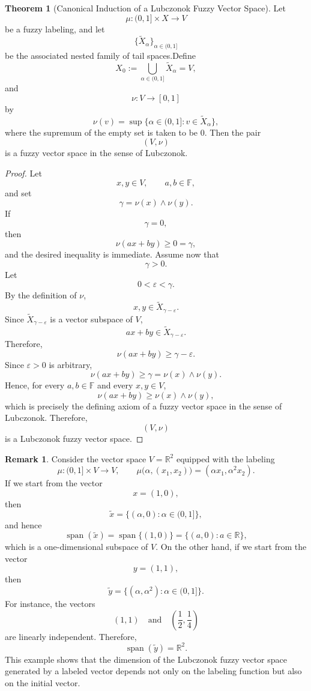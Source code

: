 \documentclass[preprint,12pt]{elsarticle}
\theoremstyle{definition}
\newtheorem{remark}{Remark}[section]
\newtheorem{theorem}{Theorem}[section]
\begin{document}
\begin{theorem}[Canonical Induction of a Lubczonok Fuzzy Vector Space]
	\label{thm:canonical-induction}
	Let
	\[
	\mu:(0,1]\times X\longrightarrow V
	\]
	be a fuzzy labeling, and let
	\[
	\{\widetilde X_\alpha\}_{\alpha\in(0,1]}
	\]
	be the associated nested family of tail spaces.Define
		\[
	X_0:=
	\bigcup_{\alpha\in(0,1]}
	\widetilde X_\alpha
	=
	V,
	\]
	and
	\[
	\nu:V\longrightarrow[0,1]
	\]
	by
	\[
	\nu(v)
	=
	\sup\{\alpha\in(0,1]:v\in\widetilde X_\alpha\},
	\]
	where the supremum of the empty set is taken to be \(0\).
	Then the pair
	\[
	(V,\nu)
	\]
	is a fuzzy vector space in the sense of Lubczonok.
\end{theorem}

\begin{proof}
	
Let
	\[
	x,y\in V,
	\qquad
	a,b\in\mathbb F,
	\]
	and set
	\[
	\gamma
	=
	\nu(x)\wedge\nu(y).
	\]
	If
	\[
	\gamma=0,
	\]
	then
	\[
	\nu(ax+by)\ge0=\gamma,
	\]
	and the desired inequality is immediate.
	Assume now that
	\[
	\gamma>0.
	\]
	Let
	\[
	0<\varepsilon<\gamma.
	\]
	By the definition of \(\nu\),
	\[
	x,y\in
	\widetilde X_{\gamma-\varepsilon}.
	\]
	Since
	\(
	\widetilde X_{\gamma-\varepsilon}
	\)
	is a vector subspace of \(V\),
	\[
	ax+by
	\in
	\widetilde X_{\gamma-\varepsilon}.
	\]
	Therefore,
	\[
	\nu(ax+by)
	\ge
	\gamma-\varepsilon.
	\]
	Since \(\varepsilon>0\) is arbitrary,
	\[
	\nu(ax+by)
	\ge
	\gamma
	=
	\nu(x)\wedge\nu(y).
	\]
	Hence, for every
	\(a,b\in\mathbb F\) and every
	\(x,y\in V\),
	\[
	\nu(ax+by)
	\ge
	\nu(x)\wedge\nu(y),
	\]
	which is precisely the defining axiom of a fuzzy vector space in the sense
	of Lubczonok.
	Therefore,
	\[
	(V,\nu)
	\]
	is a Lubczonok fuzzy vector space.
	
\end{proof}



	
	 
	\begin{remark}
		Consider the vector space $V=\mathbb{R}^{2}$ equipped with the labeling
		\[
		\mu:(0,1]\times V\longrightarrow V,
		\qquad
		\mu\bigl(\alpha,(x_{1},x_{2})\bigr)
		=
		(\alpha x_{1},\alpha^{2}x_{2}).
		\]
		If we start from the vector
		\[
		x=(1,0),
		\]
		then
		\[
		\widetilde{x}
		=
		\{(\alpha,0):\alpha\in(0,1]\},
		\]
		and hence
		\[
		\operatorname{span}(\widetilde{x})
		=
		\operatorname{span}\{(1,0)\}
		=
		\{(a,0):a\in\mathbb{R}\},
		\]
		which is a one-dimensional subspace of $V$.
		On the other hand, if we start from the vector
		\[
		y=(1,1),
		\]
		then
		\[
		\widetilde{y}
		=
		\{(\alpha,\alpha^{2}):\alpha\in(0,1]\}.
		\]
		For instance, the vectors
		\[
		(1,1)
		\quad\text{and}\quad
		\left(\frac12,\frac14\right)
		\]
		are linearly independent. Therefore,
		\[
		\operatorname{span}(\widetilde{y})
		=
		\mathbb{R}^{2}.
		\]
		This example shows that the dimension of the Lubczonok fuzzy vector space generated by a labeled vector depends not only on the labeling function but also on the initial vector.
	\end{remark}
	
\end{document}
